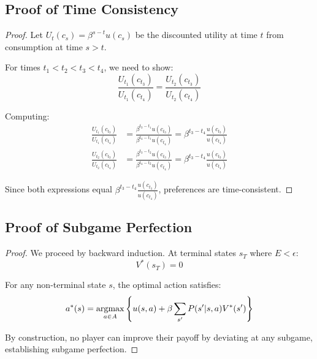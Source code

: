 \documentclass[11pt,a4paper]{article}
\newcommand{\argmax}{\operatornamewithlimits{argmax}}
\begin{document}
\subsection{Proof of Time Consistency}

\begin{proof}
Let $U_t(c_s) = \beta^{s-t} u(c_s)$ be the discounted utility at time $t$ from consumption at time $s > t$.

For times $t_1 < t_2 < t_3 < t_4$, we need to show:
\[
\frac{U_{t_1}(c_{t_3})}{U_{t_1}(c_{t_4})} = \frac{U_{t_2}(c_{t_3})}{U_{t_2}(c_{t_4})}
\]

Computing:
\begin{align}
\frac{U_{t_1}(c_{t_3})}{U_{t_1}(c_{t_4})} &= \frac{\beta^{t_3-t_1} u(c_{t_3})}{\beta^{t_4-t_1} u(c_{t_4})} = \beta^{t_3-t_4} \frac{u(c_{t_3})}{u(c_{t_4})}\\
\frac{U_{t_2}(c_{t_3})}{U_{t_2}(c_{t_4})} &= \frac{\beta^{t_3-t_2} u(c_{t_3})}{\beta^{t_4-t_2} u(c_{t_4})} = \beta^{t_3-t_4} \frac{u(c_{t_3})}{u(c_{t_4})}
\end{align}

Since both expressions equal $\beta^{t_3-t_4} \frac{u(c_{t_3})}{u(c_{t_4})}$, preferences are time-consistent.
\end{proof}

\subsection{Proof of Subgame Perfection}

\begin{proof}
We proceed by backward induction. At terminal states $s_T$ where $E < \epsilon$:
\[
V^*(s_T) = 0
\]

For any non-terminal state $s$, the optimal action satisfies:
\[
a^*(s) = \argmax_{a \in A} \left\{ u(s,a) + \beta \sum_{s'} P(s'|s,a) V^*(s') \right\}
\]

By construction, no player can improve their payoff by deviating at any subgame, establishing subgame perfection.
\end{proof}
\end{document}

